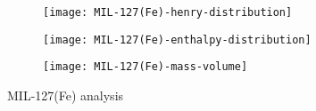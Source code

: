 \begin{figure}
    \centering
    \begin{subfigure}{0.8\textwidth}
        \parbox[c]{0.1\linewidth}{\caption{}\label{fig:analysismil127henry}}%
        \parbox[b]{0.7\linewidth}{%
        \texttt{[image: MIL-127(Fe)-henry-distribution]}%
        }%
    \end{subfigure}
    
    \begin{subfigure}{0.8\textwidth}
        \parbox[c]{0.1\linewidth}{\caption{}\label{fig:analysismil127enth}}%
        \parbox[b]{0.7\linewidth}{%
        \texttt{[image: MIL-127(Fe)-enthalpy-distribution]}%
        }%
    \end{subfigure}

    \begin{subfigure}{0.8\textwidth}
        \parbox[c]{0.1\linewidth}{\caption{}\label{fig:analysismil127basis}}%
        \parbox[b]{0.7\linewidth}{%
        \texttt{[image: MIL-127(Fe)-mass-volume]}%
        }%
    \end{subfigure}
    
    \caption{MIL-127(Fe) analysis}%
    \label{fig:analysismil127}
\end{figure}